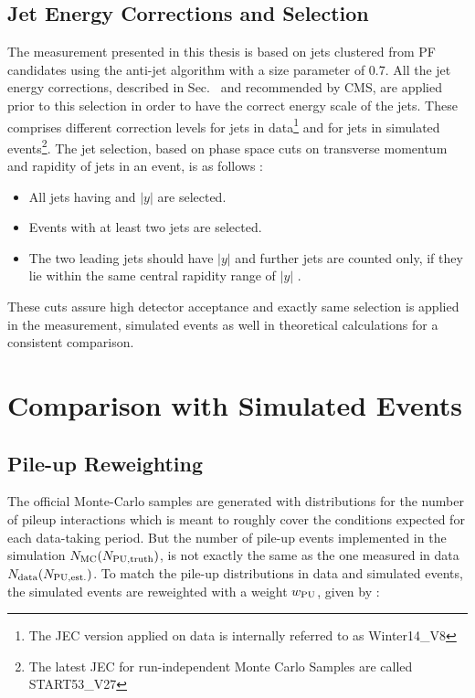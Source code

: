 \subsection{Jet Energy Corrections and Selection}
The measurement presented in this thesis is based on jets clustered from PF candidates using the anti-\kt jet algorithm with a size parameter of 0.7. All the jet energy corrections, described in Sec. \qm~and recommended by CMS, are applied prior to this selection in order to have the correct energy scale of the jets. These comprises different correction levels for jets in data\footnote{The JEC version applied on data is internally referred to as Winter14\_V8} and for jets in simulated events\footnote{The latest JEC for run-independent Monte Carlo Samples are called START53\_V27}. The jet selection, based on phase space cuts on transverse momentum and rapidity of jets in an event, is as follows : 

\begin{itemize}
\item All jets having \pt {} \GeV and $|y|$  are selected.
\item Events with at least two jets are selected.
\item The two leading jets should have $|y|$  and further jets are counted only, if they lie within the same central rapidity range of $|y|$ . 
\end{itemize}
These cuts assure high detector acceptance and exactly same selection is applied in the measurement, simulated events as well in theoretical calculations for a consistent comparison. 

\section{Comparison with Simulated Events}
\subsection{Pile-up Reweighting}
The official Monte-Carlo samples are generated with distributions for the number of pileup interactions which is meant to roughly cover the conditions expected for each data-taking period. But the number of pile-up events implemented in the simulation $N_{\rm MC} (N_{\rm PU,truth})$, is not exactly the same as the one measured in data $N_{\rm data} (N_{\rm PU,est.})$. To match the pile-up distributions in data and simulated events, the simulated events are reweighted with a weight $w_{\rm PU}$, given by :

